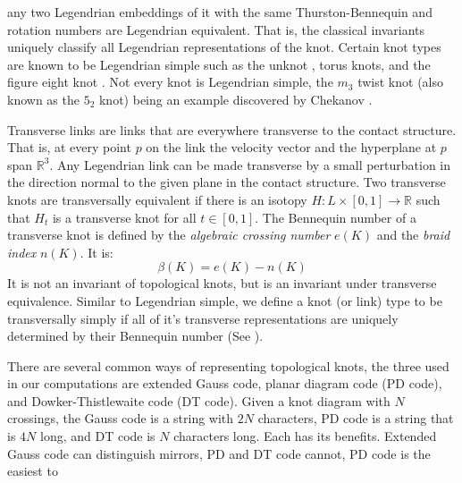 \documentclass{article}
\theoremstyle{plain}
\begin{document}
        any two Legendrian embeddings of it with the same Thurston-Bennequin
        and rotation numbers are Legendrian equivalent. That is, the classical
        invariants uniquely classify all Legendrian representations of the knot.
        Certain knot types are known to be Legendrian simple such as the unknot
        \cite{EliashbergFraserClassificationTopTrivialLegKnots}, torus knots,
        and the figure eight knot \cite{EtnyreHondaContactTopologyI}.
        Not every knot is Legendrian simple, the $m_{3}$ twist knot (also
        known as the $5_{2}$ knot) being an example discovered by Chekanov
        \cite{ChekanovDifAlgOfLegLinks}.
        \par\hfill\par
        Transverse links are links that are everywhere transverse to the
        contact structure. That is, at every point $p$ on the link the velocity
        vector and the hyperplane at $p$ span $\mathbb{R}^{3}$. Any Legendrian
        link can be made transverse by a small perturbation in the direction
        normal to the given plane in the contact structure.
        Two transverse knots are transversally equivalent if there is an
        isotopy $H:L\times[0,1]\rightarrow\mathbb{R}$ such that $H_{t}$ is a
        transverse knot for all $t\in[0,1]$. The Bennequin number of a
        transverse knot is defined by the \textit{algebraic crossing number}
        $e(K)$ and the \textit{braid index} $n(K)$. It is:
        \begin{equation}
            \beta(K)=e(K)-n(K)
        \end{equation}
        It is not an invariant of topological knots, but is an invariant under
        transverse equivalence. Similar to Legendrian simple, we define a knot
        (or link) type to be transversally simply if all of it's transverse
        representations are uniquely determined by their Bennequin number
        (See \cite{BirmanWrinkleTransversallySimpleKnots}).
        \par\hfill\par
        There are several common ways of representing topological knots, the
        three used in our computations are extended Gauss code, planar diagram
        code (PD code), and Dowker-Thistlewaite code (DT code). Given a knot
        diagram with $N$ crossings, the Gauss code is a string with $2N$
        characters, PD code is a string that is $4N$ long, and DT code is $N$
        characters long. Each has its benefits. Extended Gauss code can
        distinguish mirrors, PD and DT code cannot, PD code is the easiest to
\end{document}
